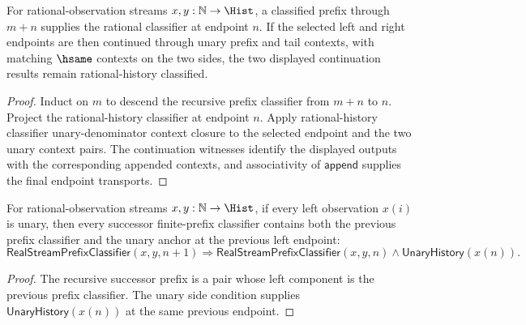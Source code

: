 \begin{theorem}
\label{thm:real-stream-prefix-truncated-cont-endpoint-context-closed}
For rational-observation streams $x,y:\mathbb{N}\to\Hist$, a classified prefix
through $m+n$ supplies the rational classifier at endpoint $n$. If the selected
left and right endpoints are then continued through unary prefix and tail
contexts, with matching $\hsame$ contexts on the two sides, the two displayed
continuation results remain rational-history classified.
\end{theorem}
\begin{proof}
Induct on $m$ to descend the recursive prefix classifier from $m+n$ to $n$.
Project the rational-history classifier at endpoint $n$. Apply rational-history
classifier unary-denominator context closure to the selected endpoint and the
two unary context pairs. The continuation witnesses identify the displayed
outputs with the corresponding appended contexts, and associativity of
$\mathsf{append}$ supplies the final endpoint transports.
\end{proof}

\begin{lemma}
\label{lem:real-stream-prefix-previous-with-unary}
For rational-observation streams \(x,y:\mathbb{N}\to\Hist\), if every left observation \(x(i)\) is unary, then every successor finite-prefix classifier contains both the previous prefix classifier and the unary anchor at the previous left endpoint:
$$
\mathsf{RealStreamPrefixClassifier}(x,y,n+1)
\Longrightarrow
\mathsf{RealStreamPrefixClassifier}(x,y,n)\wedge \mathsf{UnaryHistory}(x(n)).
$$
\end{lemma}
\begin{proof}
The recursive successor prefix is a pair whose left component is the previous prefix classifier. The unary side condition supplies \(\mathsf{UnaryHistory}(x(n))\) at the same previous endpoint.
\end{proof}

